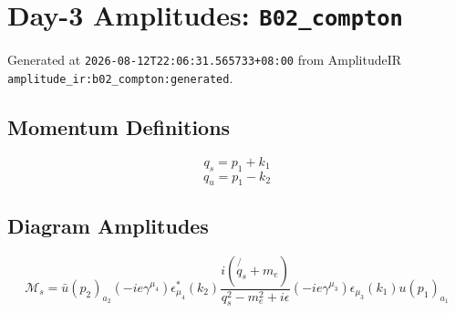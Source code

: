 \documentclass[11pt]{article}
\begin{document}
\section*{Day-3 Amplitudes: \texttt{B02\_compton}}
Generated at \texttt{2026-08-12T22:06:31.565733+08:00} from AmplitudeIR \texttt{amplitude\_ir:b02\_compton:generated}.

\subsection*{Momentum Definitions}
\[q_{s} = p_{1}+k_{1}\]
\[q_{u} = p_{1}-k_{2}\]

\subsection*{Diagram Amplitudes}
\begin{equation}
\mathcal{M}_{s} = \bar u(p_{2})_{a_{2}}\left(-i e \gamma^{\mu_{4}}\right)\epsilon^{*}_{\mu_{4}}(k_{2})\frac{i(\not{q_{s}}+m_e)}{q_{s}^2-m_e^2+i\epsilon}\left(-i e \gamma^{\mu_{3}}\right)\epsilon_{\mu_{3}}(k_{1})u(p_{1})_{a_{1}}
\end{equation}
\end{document}
